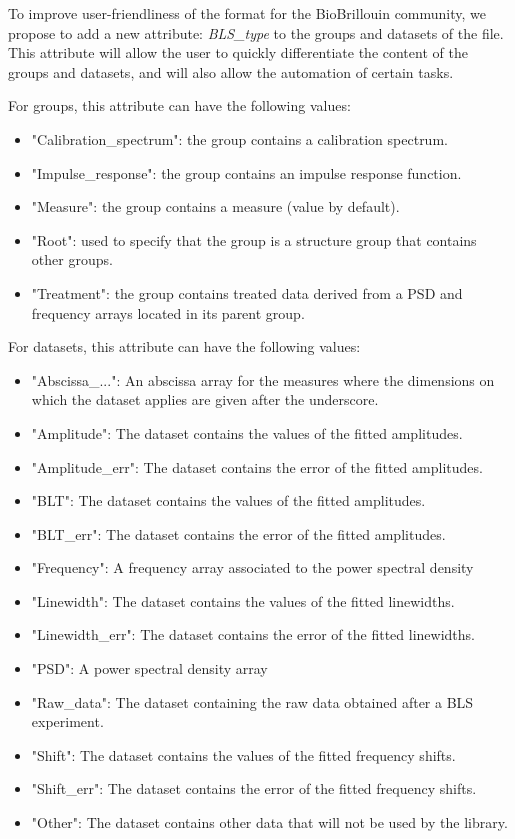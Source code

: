 To improve user-friendliness of the format for the BioBrillouin community, we propose to add a new attribute: \textit{BLS\_type} to the groups and datasets of the file. This attribute will allow the user to quickly differentiate the content of the groups and datasets, and will also allow the automation of certain tasks.

For groups, this attribute can have the following values:
\begin{itemize}
    \item "Calibration\_spectrum": the group contains a calibration spectrum.
    \item "Impulse\_response": the group contains an impulse response function.
    \item "Measure": the group contains a measure (value by default).
    \item "Root": used to specify that the group is a structure group that contains other groups.
    \item "Treatment": the group contains treated data derived from a PSD and frequency arrays located in its parent group.
\end{itemize}

For datasets, this attribute can have the following values:
\begin{itemize}
    \item "Abscissa\_...": An abscissa array for the measures where the dimensions on which the dataset applies are given after the underscore.
    \item "Amplitude": The dataset contains the values of the fitted amplitudes.
    \item "Amplitude\_err": The dataset contains the error of the fitted amplitudes.
    \item "BLT": The dataset contains the values of the fitted amplitudes.
    \item "BLT\_err": The dataset contains the error of the fitted amplitudes.
    \item "Frequency": A frequency array associated to the power spectral density
    \item "Linewidth": The dataset contains the values of the fitted linewidths.
    \item "Linewidth\_err": The dataset contains the error of the fitted linewidths. 
    \item "PSD": A power spectral density array
    \item "Raw\_data": The dataset containing the raw data obtained after a BLS experiment.
    \item "Shift": The dataset contains the values of the fitted frequency shifts.
    \item "Shift\_err": The dataset contains the error of the fitted frequency shifts.
    \item "Other": The dataset contains other data that will not be used by the library.
\end{itemize}


